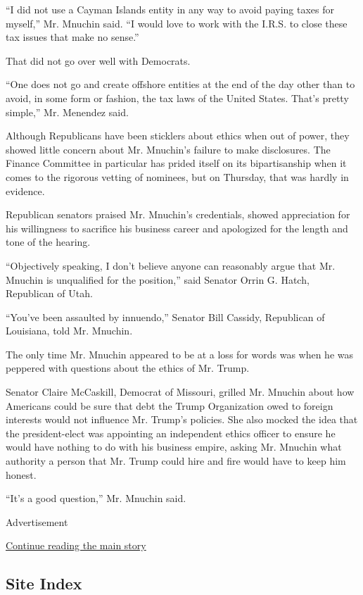 ``I did not use a Cayman Islands entity in any way to avoid paying taxes
for myself,'' Mr. Mnuchin said. ``I would love to work with the I.R.S.
to close these tax issues that make no sense.''

That did not go over well with Democrats.

``One does not go and create offshore entities at the end of the day
other than to avoid, in some form or fashion, the tax laws of the United
States. That's pretty simple,'' Mr. Menendez said.

Although Republicans have been sticklers about ethics when out of power,
they showed little concern about Mr. Mnuchin's failure to make
disclosures. The Finance Committee in particular has prided itself on
its bipartisanship when it comes to the rigorous vetting of nominees,
but on Thursday, that was hardly in evidence.

Republican senators praised Mr. Mnuchin's credentials, showed
appreciation for his willingness to sacrifice his business career and
apologized for the length and tone of the hearing.

``Objectively speaking, I don't believe anyone can reasonably argue that
Mr. Mnuchin is unqualified for the position,'' said Senator Orrin G.
Hatch, Republican of Utah.

``You've been assaulted by innuendo,'' Senator Bill Cassidy, Republican
of Louisiana, told Mr. Mnuchin.

The only time Mr. Mnuchin appeared to be at a loss for words was when he
was peppered with questions about the ethics of Mr. Trump.

Senator Claire McCaskill, Democrat of Missouri, grilled Mr. Mnuchin
about how Americans could be sure that debt the Trump Organization owed
to foreign interests would not influence Mr. Trump's policies. She also
mocked the idea that the president-elect was appointing an independent
ethics officer to ensure he would have nothing to do with his business
empire, asking Mr. Mnuchin what authority a person that Mr. Trump could
hire and fire would have to keep him honest.

``It's a good question,'' Mr. Mnuchin said.

Advertisement

\protect\hyperlink{after-bottom}{Continue reading the main story}

\hypertarget{site-index}{%
\subsection{Site Index}\label{site-index}}

